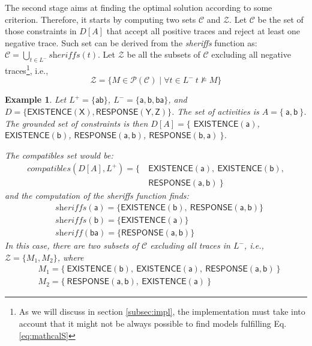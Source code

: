 \documentclass[a4wide,11pt]{article}
\theoremstyle{definition}
\theoremstyle{plain}
\newtheorem{example}{Example}[section]
\newcommand{\sheriff}{sheriffs}
\begin{document}
The second stage aims at finding the optimal solution according to some criterion. Therefore, it starts by computing two sets $\mathcal{C}$ and $\mathcal{Z}$. 
%
Let $\mathcal{C}$ be the set of those constraints in $D[A]$ that accept all positive traces and reject at least one negative trace. Such set can be derived from the \textit{\sheriff} function as: $\mathcal{C} = \bigcup_{t\in L^-} \textit{\sheriff}(t)$.
Let $\mathcal{Z}$ be all the subsets of $\mathcal{C}$ excluding all negative traces\footnote{As we will discuss in section \ref{subsec:impl}, the implementation must take into account that it might not be always possible to find models fulfilling Eq.\ref{eq:mathcalS}}, i.e.,
\begin{equation}\label{eq:mathcalS}
\mathcal{Z}=\{M\in\mathcal{P}(\mathcal{C})\mid \forall t\in L^-~t\not\models M \} 
\end{equation}

\begin{example}
Let $L^+=\{\mathsf{ab}\}$, $L^-=\{\mathsf{a, b, ba}\}$, and $D=\{\mathsf{EXISTENCE(X)},\mathsf{RESPONSE(Y,Z)}\}$.
%
The set of activities is $A=\{\ \mathsf{a}, \mathsf{b}\ \}$.
The grounded set of constraints is then $D[A] = \{$ $\mathsf{EXISTENCE(a)}$, $\mathsf{EXISTENCE(b)}$, $\mathsf{RESPONSE(a,b)}$, $\mathsf{RESPONSE(b,a)}\ \}$.

The \textit{compatibles} set would be:
\begin{align*}
compatibles(D[A], L^+) =  \{\ & \mathsf{EXISTENCE(a)},\ \mathsf{EXISTENCE(b)},\\
&  \mathsf{RESPONSE(a,b)} \ \}	
\end{align*}
%
and the computation of the \textit{\sheriff} function finds:
\begin{subequations}
 \begin{align*}
     &\textit{\sheriff}(\mathsf{a}) =\{\mathsf{EXISTENCE(b)},\ \mathsf{RESPONSE(a,b)}\} \\
     &\textit{\sheriff}(\mathsf{b}) =\{\mathsf{EXISTENCE(a)}\} \\
     &\textit{sheriff}(\mathsf{ba})=\{\mathsf{RESPONSE(a,b)}\}
 \end{align*}
%
\end{subequations}
In this case, there are two subsets of $\mathcal{C}$ excluding all traces in $L^-$, i.e., $\mathcal{Z}=\{M_1,M_2\}$, where
\begin{subequations}
 \begin{align*}
     & M_1=\{\ \mathsf{EXISTENCE(b)},\ \mathsf{EXISTENCE(a)},\ \mathsf{RESPONSE(a,b)}\ \} \\
     & M_2=\{\ \mathsf{RESPONSE(a,b)},\ \mathsf{EXISTENCE(a)}\ \}
 \end{align*}
\end{subequations}
\end{example}
\end{document}
